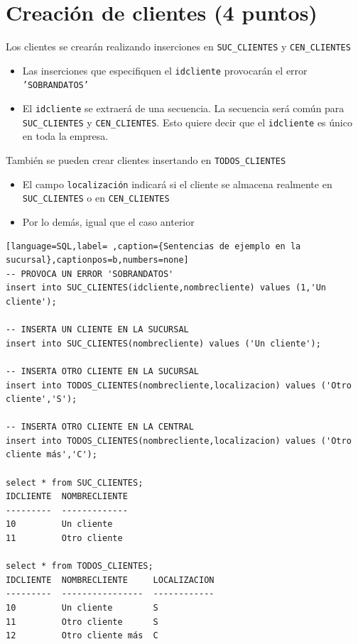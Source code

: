 \documentclass[a4paper]{article}
\begin{document}
\newpage
\section{Creación de clientes (4 puntos)}
\label{sec:org0000012}
Los clientes se crearán realizando inserciones en \texttt{SUC\_CLIENTES} y \texttt{CEN\_CLIENTES}
\begin{itemize}
\item Las inserciones que especifiquen el \texttt{idcliente} provocarán el error \texttt{'SOBRANDATOS'}
\item El \texttt{idcliente} se extraerá de una secuencia. La secuencia será común para \texttt{SUC\_CLIENTES} y \texttt{CEN\_CLIENTES}. Esto quiere decir que el \texttt{idcliente} es único en toda la empresa.
\end{itemize}
También se pueden crear clientes insertando en \texttt{TODOS\_CLIENTES}
\begin{itemize}
\item El campo \texttt{localización} indicará si el cliente se almacena realmente en \texttt{SUC\_CLIENTES} o en \texttt{CEN\_CLIENTES}
\item Por lo demás, igual que el caso anterior
\end{itemize}



\begin{lstlisting}[language=SQL,label= ,caption={Sentencias de ejemplo en la sucursal},captionpos=b,numbers=none]
-- PROVOCA UN ERROR 'SOBRANDATOS'
insert into SUC_CLIENTES(idcliente,nombrecliente) values (1,'Un cliente');

-- INSERTA UN CLIENTE EN LA SUCURSAL
insert into SUC_CLIENTES(nombrecliente) values ('Un cliente');

-- INSERTA OTRO CLIENTE EN LA SUCURSAL
insert into TODOS_CLIENTES(nombrecliente,localizacion) values ('Otro cliente','S');

-- INSERTA OTRO CLIENTE EN LA CENTRAL
insert into TODOS_CLIENTES(nombrecliente,localizacion) values ('Otro cliente más','C');

select * from SUC_CLIENTES;
IDCLIENTE  NOMBRECLIENTE
---------  -------------
10         Un cliente
11         Otro cliente

select * from TODOS_CLIENTES;
IDCLIENTE  NOMBRECLIENTE     LOCALIZACION
---------  ----------------  ------------
10         Un cliente        S
11         Otro cliente      S
12         Otro cliente más  C
\end{lstlisting}
\end{document}
